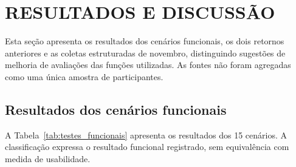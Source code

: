 \documentclass{UNESC}
\begin{document}
\section{RESULTADOS E DISCUSSÃO}

Esta seção apresenta os resultados dos cenários funcionais, os dois retornos anteriores e as coletas estruturadas de novembro, distinguindo sugestões de melhoria de avaliações das funções utilizadas. As fontes não foram agregadas como uma única amostra de participantes.

\subsection{Resultados dos cenários funcionais}

A Tabela~\ref{tab:testes_funcionais} apresenta os resultados dos 15 cenários. A classificação expressa o resultado funcional registrado, sem equivalência com medida de usabilidade.
\end{document}
